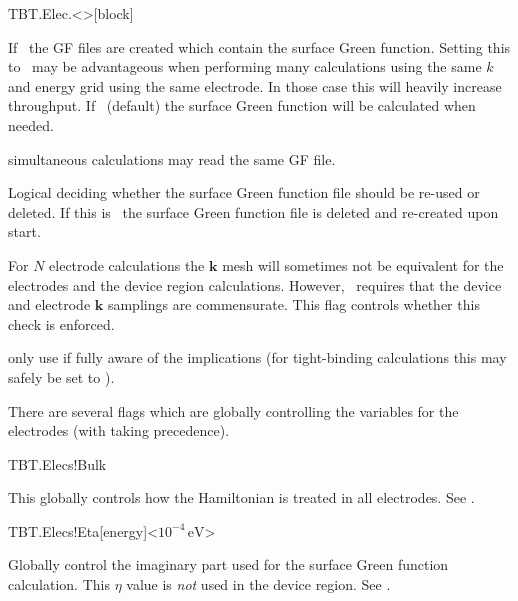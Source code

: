 \begin{fdfentry}{TBT.Elec.<>}[block]
\begin{fdfoptions}
    If \fdftrue\ the GF files are created which contain the surface
    Green function. Setting this to \fdftrue\ may be advantageous when
    performing many calculations using the same $k$ and energy grid
    using the same electrode. In those case this will heavily increase
    throughput. 
    If \fdffalse\ (default) the surface Green function will be
    calculated when needed. 

    \note simultaneous calculations may read the same GF file.

    \option[Gf-Reuse]%
    Logical deciding whether the surface Green function file should be
    re-used or deleted.
    If this is \fdffalse\ the surface Green function file is deleted
    and re-created upon start.

    For $N$ electrode calculations the $\mathbf k$ mesh will sometimes
    not be equivalent for the electrodes and the device region
    calculations. However, \tbtrans\ requires that the device and
    electrode $\mathbf k$ samplings are commensurate. This flag
    controls whether this check is enforced. 

    \note only use if fully aware of the implications (for
    tight-binding calculations this may safely be set to \fdffalse).

  \end{fdfoptions}
  
\end{fdfentry}

There are several flags which are globally controlling the variables
for the electrodes (with  taking precedence).

\begin{fdflogicalT}{TBT.Elecs!Bulk}

  This globally controls how the Hamiltonian is treated in all
  electrodes. 
  See .
  
\end{fdflogicalT}

\begin{fdfentry}{TBT.Elecs!Eta}[energy]<$10^{-4}\,\mathrm{eV}$>
  
  Globally control the imaginary part used for the surface Green
  function calculation. This $\eta$ value is \emph{not} used in the
  device region.
  See .
  
\end{fdfentry}

